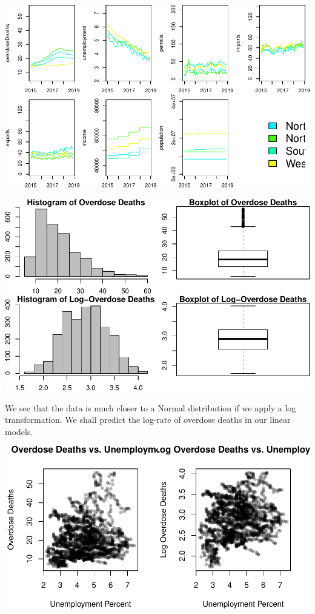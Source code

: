 \documentclass[]{article}
\begin{document}
\begin{center}\includegraphics{stat139_project_final_files/figure-latex/toy-2} \end{center}

\begin{center}\includegraphics{stat139_project_final_files/figure-latex/unnamed-chunk-1-1} \end{center}

We see that the data is much closer to a Normal distribution if we apply
a log transformation. We shall predict the log-rate of overdose deaths
in our linear models.

\begin{center}\includegraphics{stat139_project_final_files/figure-latex/unnamed-chunk-2-1} \end{center}
\end{document}
